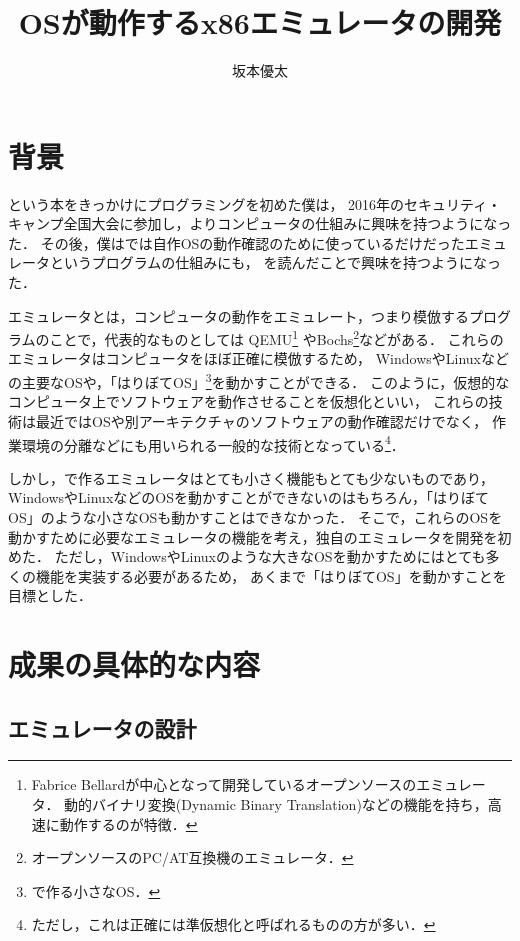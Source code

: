 \documentclass[10pt,a4j]{jsarticle}
\title{\vspace{-1.0cm}OSが動作するx86エミュレータの開発}
\author{坂本優太}
\date{}
\begin{document}
\maketitle
\vspace{-1.0cm}

\section{背景}
\cite[30日でできる！ OS自作入門]{30days-osdev}という本をきっかけにプログラミングを初めた僕は，
2016年のセキュリティ・キャンプ全国大会に参加し，よりコンピュータの仕組みに興味を持つようになった．
その後，僕は\cite{30days-osdev}では自作OSの動作確認のために使っているだけだったエミュレータというプログラムの仕組みにも，
\cite[自作エミュレータで学ぶx86アーキテクチャ]{learn-x86-by-emu}を読んだことで興味を持つようになった．

エミュレータとは，コンピュータの動作をエミュレート，つまり模倣するプログラムのことで，代表的なものとしては
QEMU\footnote{Fabrice Bellardが中心となって開発しているオープンソースのエミュレータ．
動的バイナリ変換(Dynamic Binary Translation)などの機能を持ち，高速に動作するのが特徴．}
やBochs\footnote{オープンソースのPC/AT互換機のエミュレータ．}などがある．
これらのエミュレータはコンピュータをほぼ正確に模倣するため，
WindowsやLinuxなどの主要なOSや，「はりぼてOS」\footnote{\cite{30days-osdev}で作る小さなOS．}を動かすことができる．
このように，仮想的なコンピュータ上でソフトウェアを動作させることを仮想化といい，
これらの技術は最近ではOSや別アーキテクチャのソフトウェアの動作確認だけでなく，
作業環境の分離などにも用いられる一般的な技術となっている\footnote{ただし，これは正確には準仮想化と呼ばれるものの方が多い．}．

しかし，\cite{learn-x86-by-emu}で作るエミュレータはとても小さく機能もとても少ないものであり，
WindowsやLinuxなどのOSを動かすことができないのはもちろん，「はりぼてOS」のような小さなOSも動かすことはできなかった．
そこで，これらのOSを動かすために必要なエミュレータの機能を考え，独自のエミュレータを開発を初めた．
ただし，WindowsやLinuxのような大きなOSを動かすためにはとても多くの機能を実装する必要があるため，
あくまで「はりぼてOS」を動かすことを目標とした．

\section{成果の具体的な内容}

\subsection{エミュレータの設計}
\end{document}
